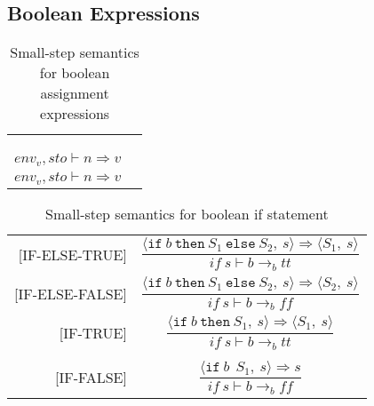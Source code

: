 \subsection{Boolean Expressions}
\begin{table}[H]
    \centering
    \begin{longtable}[c] { r c }
    \begin{tabular}{@{}c@{}} 
    [ASS1] &
    \\
    \\
    \end{tabular}
  \begin{tabular}{@{}c@{}}   \( <x := a, sto, env_l> \Rightarrow (sto[l -> v], envl) \)  \\ \( env_v,sto \vdash n \Rightarrow v \)
  \\ \( env_v,sto \vdash n \Rightarrow v \)
  \end{tabular}
        
 \end{longtable}
    \caption{Small-step semantics for boolean assignment expressions}\label{tab:my_label}
\end{table}
        
\begin{table}[H]
    \centering
    \begin{longtable}[c] { r c }
        
        [IF-ELSE-TRUE] & \( \dfrac{\langle \texttt{if} \ b \ \texttt{then} \ S_1 \ \texttt{else} \ S_2,\ s \rangle \Rightarrow \langle S_1,\ s\rangle}{if\ s\vdash b \rightarrow_b tt} \) \\[4ex]
        
        [IF-ELSE-FALSE] & \( \dfrac{\langle \texttt{if} \ b \ \texttt{then} \ S_1 \ \texttt{else} \ S_2,\ s \rangle \Rightarrow \langle S_2,\ s \rangle}{if\ s\vdash b \rightarrow_b ff} \) \\[4ex]
        
        [IF-TRUE] & \( \dfrac{\langle \texttt{if} \ b \ \texttt{then} \ S_1,\ s \rangle \Rightarrow \langle S_1,\ s \rangle}{if \ s\vdash b \rightarrow_b tt} \) \\\\
        
        [IF-FALSE] & \( \dfrac{\langle \texttt{if} \ b \ \texttt \ S_1,\ s \rangle \Rightarrow s}{if\ s\vdash b \rightarrow_b ff} \) \\[4ex]
        
 \end{longtable}
    \caption{Small-step semantics for boolean if statement}\label{tab:my_label}
\end{table}
        
